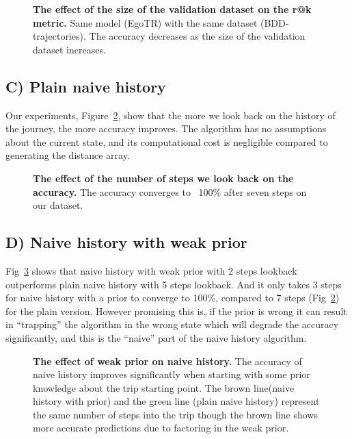 \documentclass[10pt,letterpaper]{article}
\begin{document}
\begin{figure}[!h]
  \caption{{\bf The effect of the size of the validation dataset on the r@k metric.}  Same model (EgoTR) with the same dataset (BDD-trajectories). The accuracy decreases as the size of the validation dataset increases.}
  \label{fig17}
\end{figure}
\subsection*{C) Plain naive history}
Our experiments, Figure~\ref{fig18}, show that the more we look back on the history of the journey, the more accuracy improves. The algorithm has no assumptions about the current state, and its computational cost is negligible compared to generating the distance array.


\begin{figure}[!h]
  \caption{{\bf The effect of the number of steps we look back on the accuracy.} The accuracy converges to ~100\% after seven steps on our dataset.}
  \label{fig18}
\end{figure}

\subsection*{D) Naive history with weak prior}
Fig~\ref{fig19} shows that naive history with weak prior with 2 steps lookback outperforms plain naive history with 5 steps lookback. And it only takes 3 steps for naive history with a prior to converge to 100\%, compared to 7 steps (Fig~\ref{fig18}) for the plain version. 
However promising this is, if the prior is wrong it can result in “trapping” the algorithm in the wrong state which will degrade the accuracy significantly, and this is the “naive” part of the naive history algorithm.

\begin{figure}[!h]
  \caption{{\bf The effect of weak prior on naive history.}  The accuracy of naive history improves significantly when starting with some prior knowledge about the trip starting point. The brown line(naive history with prior) and the green line (plain naive history) represent the same number of steps into the trip though the brown line shows more accurate predictions due to factoring in the weak prior.}
  \label{fig19}
\end{figure}
\end{document}
